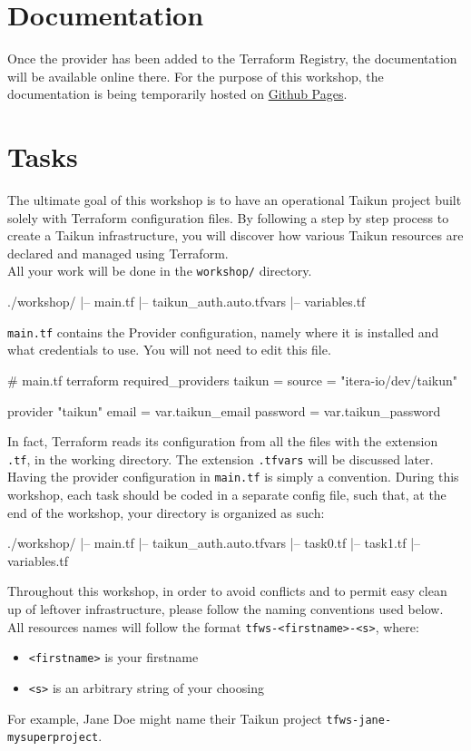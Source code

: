 \section{Documentation}
Once the provider has been added to the Terraform Registry, the documentation will be available online there.
For the purpose of this workshop, the documentation is being temporarily hosted on \href{https://intuinewin.github.io/taikun-docs/}{Github Pages}.

\section{Tasks}
The ultimate goal of this workshop is to have an operational Taikun project built solely with Terraform
configuration files.
By following a step by step process to create a Taikun infrastructure,
you will discover how various Taikun resources are declared and managed using Terraform.\\

All your work will be done in the \texttt{workshop/} directory.
\begin{raw}
./workshop/
|-- main.tf
|-- taikun_auth.auto.tfvars
|-- variables.tf
\end{raw}
\texttt{main.tf} contains the Provider configuration, namely where it is installed
and what credentials to use. You will not need to edit this file.
\begin{tf}
# main.tf
terraform {
  required_providers {
    taikun = {
      source = "itera-io/dev/taikun"
    }
  }
}

provider "taikun" {
  email    = var.taikun_email
  password = var.taikun_password
}
\end{tf}
In fact, Terraform reads its configuration from all the files with the extension \texttt{.tf},
in the working directory. The extension \texttt{.tfvars} will be discussed later.
Having the provider configuration in \texttt{main.tf} is simply a convention.
During this workshop, each task should be coded in a separate config file,
such that, at the end of the workshop, your directory is organized as such:
\begin{raw}
./workshop/
|-- main.tf
|-- taikun_auth.auto.tfvars
|-- task0.tf
|-- task1.tf
|-- variables.tf
\end{raw}

\begin{warn}
  Throughout this workshop, in order to avoid conflicts and
  to permit easy clean up of leftover infrastructure, please follow the naming conventions used below.\\

  All resources names will follow the format \texttt{tfws-<firstname>-<s>}, where:
  \begin{itemize}
    \item \texttt{<firstname>} is your firstname
    \item \texttt{<s>} is an arbitrary string of your choosing
  \end{itemize}
  For example, Jane Doe might name their Taikun project \texttt{tfws-jane-mysuperproject}.
\end{warn}


